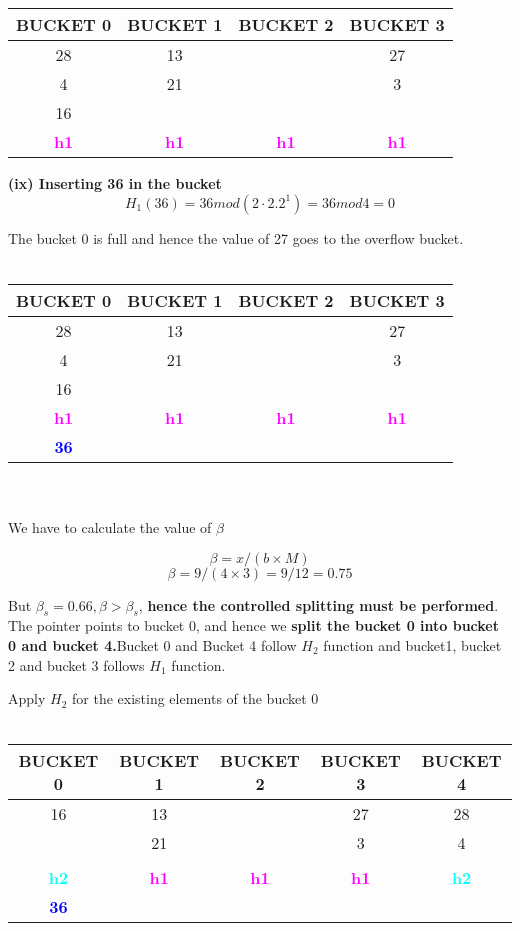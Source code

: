 \begin{tabular}{ |c|c|c|c| } 
 \hline
 \textbf{\color{red}{P}} BUCKET 0 & BUCKET 1 & BUCKET 2 & BUCKET 3\\ [0.5ex] 
 \hline\hline
 \hline
  28 & 13 &  &27\\ 
   4 & 21 &  &3\\
    16 &  &  &\\
 \hline
 \hline
\textbf{\textcolor{magenta}{h1}} & \textbf{\textcolor{magenta}{h1}}& \textbf{\textcolor{magenta}{h1}}&\textbf{\textcolor{magenta}{h1}}\\ [0.5ex] 
 \hline
\end{tabular}

\textbf{(ix) Inserting 36 in the bucket}
\[H_1(36) = 36 mod (2 \cdot 2.2^1)  = 36 mod 4 = 0\]

The bucket 0 is full and hence the value of 27 goes to the overflow bucket.
\\
\\
\begin{tabular}{ |c|c|c|c| } 
 \hline
 \textbf{\color{red}{P}} BUCKET 0 & BUCKET 1 & BUCKET 2 & BUCKET 3\\ [0.5ex] 
 \hline\hline
 \hline
  28 & 13 &  &27\\ 
   4 & 21 &  &3\\
    16 &  &  &\\
 \hline
 \hline
\textbf{\textcolor{magenta}{h1}} & \textbf{\textcolor{magenta}{h1}}& \textbf{\textcolor{magenta}{h1}}&\textbf{\textcolor{magenta}{h1}}\\ [0.5ex] 
 \hline
 \textbf{\textcolor{blue}{36}}
\end{tabular}
\\
\\
We have to calculate the value of $\beta$

\[\beta = x/(b \times M)\]
\[\beta = 9/(4 \times 3) = 9/12 = 0.75\]

But $\beta_s = 0.66 , \beta>\beta_s$,\textbf{ hence the controlled splitting must be performed}. The pointer points to bucket 0, and hence we \textbf{split the bucket 0 into bucket 0 and bucket 4.}Bucket 0 and Bucket 4 follow $H_2$ function and bucket1, bucket 2 and bucket 3 follows $H_1$ function.

Apply $H_2$ for the existing elements of the bucket 0
\\
\\

\begin{tabular}{ |c|c|c|c|c|} 
 \hline
  BUCKET 0 & \textbf{\color{red}{P}} BUCKET 1 & BUCKET 2 & BUCKET 3 & BUCKET 4\\ [0.5ex] 
 \hline\hline
 \hline
  16 & 13 &  & 27& 28\\ 
    & 21 &  & 3& 4\\
     &  &  &  &\\
 \hline
 \hline
\textbf{\textcolor{cyan}{h2}} & \textbf{\textcolor{magenta}{h1}}& \textbf{\textcolor{magenta}{h1}}&\textbf{\textcolor{magenta}{h1}}&\textbf{\textcolor{cyan}{h2}}\\ [0.5ex] 
 \hline
 \textbf{\textcolor{blue}{36}}
\end{tabular}


